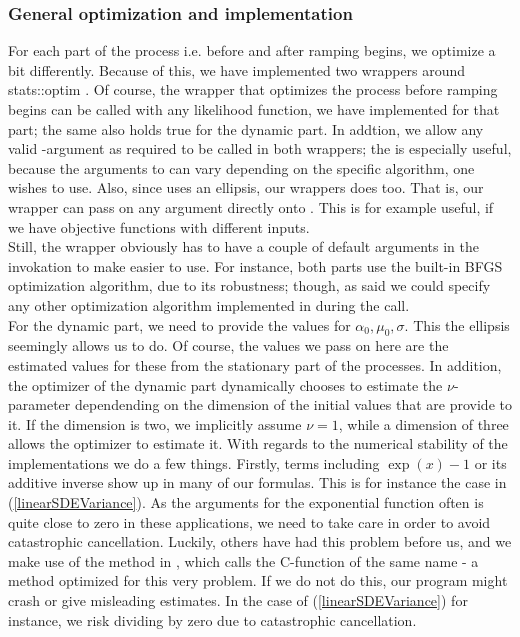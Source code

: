 \subsubsection{General optimization and implementation}
For each part of the process i.e. before and after ramping begins, we optimize a bit differently. Because of this, we have implemented two wrappers around {stats::optim} \cite{Rlang}. Of course, the wrapper that optimizes the process before ramping begins can be called with any likelihood function, we have implemented for that part; the same also holds true for the dynamic part. In addtion, we allow any valid -argument as required to be called in both wrappers; the is especially useful, because the arguments to  can vary depending on the specific algorithm, one wishes to use. Also, since  uses an ellipsis, our wrappers does too. That is, our wrapper can pass on any argument directly onto . This is for example useful, if we have objective functions with different inputs.\\
Still, the wrapper obviously has to have a couple of default arguments in the invokation to make easier to use. For instance, both parts use the built-in BFGS optimization algorithm, due to its robustness; though, as said we could specify any other optimization algorithm implemented in  during the call.\\ For the dynamic part, we need to provide the values for $\alpha_0, \mu_0, \sigma$. This the ellipsis seemingly allows us to do. Of course, the values we pass on here are the estimated values for these from the stationary part of the processes. In addition, the optimizer of the dynamic part dynamically chooses to estimate the $\nu$-parameter dependending on the dimension of the initial values that are provide to it. If the dimension is two, we implicitly assume $\nu = 1$, while a dimension of three allows the optimizer to estimate it. With regards to the numerical stability of the implementations we do a few things. Firstly, terms including $\exp\left(x\right) - 1$ or its additive inverse show up in many of our formulas. This is for instance the case in (\ref{linearSDEVariance}). As the arguments for the exponential function often is quite close to zero in these applications, we need to take care in order to avoid catastrophic cancellation. Luckily, others have had this problem before us, and we make use of the  method in , which calls the C-function of the same name \cite{cppreference_expm1} - a method optimized for this very problem. If we do not do this, our program might crash or give misleading estimates. In the case of (\ref{linearSDEVariance}) for instance, we risk dividing by zero due to catastrophic cancellation.
